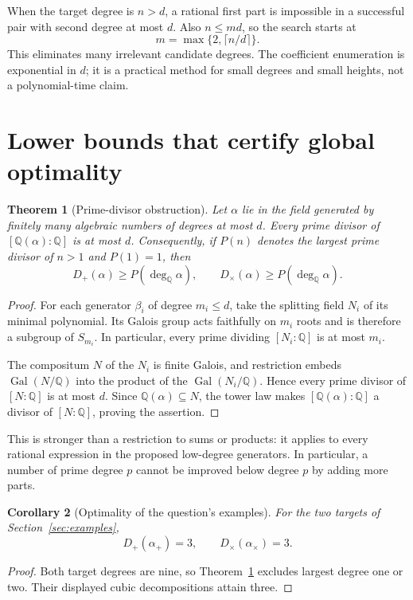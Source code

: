 \documentclass[11pt,a4paper]{article}
\newtheorem{theorem}{Theorem}[section]
\newtheorem{corollary}[theorem]{Corollary}
\theoremstyle{definition}\newtheorem{definition}[theorem]{Definition}
\theoremstyle{remark}\newtheorem{remark}[theorem]{Remark}
\newcommand{\Q}{\mathbb{Q}}\newcommand{\C}{\mathbb{C}}
\newcommand{\Gal}{\operatorname{Gal}}
\newcommand{\degQ}{\deg_{\Q}}
\begin{document}
When the target degree is $n>d$, a rational first part is impossible in a successful pair with second degree at most $d$. Also $n\leq m d$, so the search starts at
\[
m=\max\{2,\lceil n/d\rceil\}.
\]
This eliminates many irrelevant candidate degrees. The coefficient enumeration is exponential in $d$; it is a practical method for small degrees and small heights, not a polynomial-time claim.

\section{Lower bounds that certify global optimality}
\label{sec:bounds}
\begin{theorem}[Prime-divisor obstruction]\label{thm:prime}
Let $\alpha$ lie in the field generated by finitely many algebraic numbers of degrees at most $d$. Every prime divisor of $[\Q(\alpha):\Q]$ is at most $d$. Consequently, if $P(n)$ denotes the largest prime divisor of $n>1$ and $P(1)=1$, then
\[
D_+(\alpha)\geq P(\degQ\alpha),\qquad
D_{\times}(\alpha)\geq P(\degQ\alpha).
\]
\end{theorem}
\begin{proof}
For each generator $\beta_i$ of degree $m_i\leq d$, take the splitting field $N_i$ of its minimal polynomial. Its Galois group acts faithfully on $m_i$ roots and is therefore a subgroup of $S_{m_i}$. In particular, every prime dividing $[N_i:\Q]$ is at most $m_i$.

The compositum $N$ of the $N_i$ is finite Galois, and restriction embeds $\Gal(N/\Q)$ into the product of the $\Gal(N_i/\Q)$. Hence every prime divisor of $[N:\Q]$ is at most $d$. Since $\Q(\alpha)\subseteq N$, the tower law makes $[\Q(\alpha):\Q]$ a divisor of $[N:\Q]$, proving the assertion.\end{proof}

This is stronger than a restriction to sums or products: it applies to every rational expression in the proposed low-degree generators. In particular, a number of prime degree $p$ cannot be improved below degree $p$ by adding more parts.

\begin{corollary}[Optimality of the question's examples]
For the two targets of Section~\ref{sec:examples},
\[
\boxed{D_+(\alpha_+)=3,\qquad D_{\times}(\alpha_{\times})=3.}
\]
\end{corollary}
\begin{proof}
Both target degrees are nine, so Theorem~\ref{thm:prime} excludes largest degree one or two. Their displayed cubic decompositions attain three.\end{proof}
\end{document}
